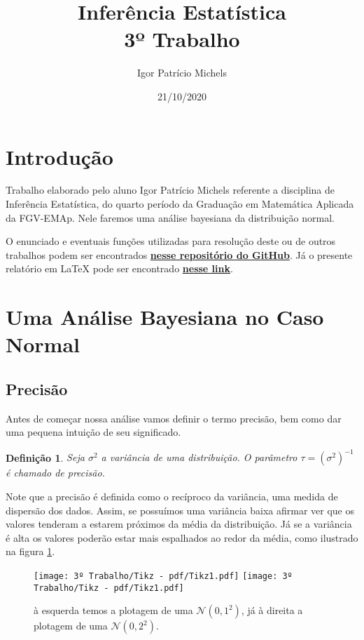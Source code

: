 \documentclass{article}
\title{Inferência Estatística \\ 3º Trabalho}
\author{Igor Patrício Michels}
\date{21/10/2020}
\newtheorem{definition}{Definição}
\begin{document}
\maketitle

\section*{Introdução}

Trabalho elaborado pelo aluno Igor Patrício Michels referente a disciplina de Inferência Estatística, do quarto período da Graduação em Matemática Aplicada da FGV-EMAp. Nele faremos uma análise bayesiana da distribuição normal.

O enunciado e eventuais funções utilizadas para resolução deste ou de outros trabalhos podem ser encontrados \href{https://github.com/IgorMichels/Statistical_Inference}{\textbf{nesse repositório do GitHub}}. Já o presente relatório em \LaTeX{} pode ser encontrado \href{https://www.overleaf.com/read/sdfnbcnthrms}{\textbf{nesse link}}.

\section*{Uma Análise Bayesiana no Caso Normal}

\subsection*{Precisão}

Antes de começar nossa análise vamos definir o termo precisão, bem como dar uma pequena intuição de seu significado.

\begin{definition}
    Seja $\sigma^2$ a variância de uma distribuição. O parâmetro $\tau = \left(\sigma^2\right)^{-1}$ é chamado de precisão.
\end{definition}

Note que a precisão é definida como o recíproco da variância, uma medida de dispersão dos dados. Assim, se possuímos uma variância baixa afirmar ver que os valores tenderam a estarem próximos da média da distribuição. Já se a variância é alta os valores poderão estar mais espalhados ao redor da média, como ilustrado na figura \ref{gaussianas}.
\begin{figure}[H]
    \texttt{[image: 3º Trabalho/Tikz - pdf/Tikz1.pdf]}
    \texttt{[image: 3º Trabalho/Tikz - pdf/Tikz1.pdf]}
    \caption{à esquerda temos a plotagem de uma $\mathcal{N}(0, 1^2)$, já à direita a plotagem de uma $\mathcal{N}(0, 2^2)$.}
    \label{gaussianas}
\end{figure}
\end{document}
